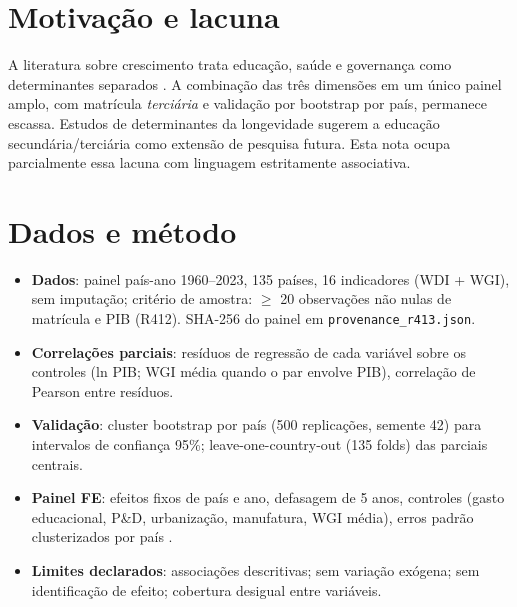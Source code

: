 \documentclass[12pt,a4paper]{article}
\begin{document}
\section{Motivação e lacuna}

A literatura sobre crescimento trata educação, saúde e governança como determinantes separados \cite{acemoglu2014,barro2013,kaufmann2011}. A combinação das três dimensões em um único painel amplo, com matrícula \emph{terciária} e validação por bootstrap por país, permanece escassa. Estudos de determinantes da longevidade sugerem a educação secundária/terciária como extensão de pesquisa futura. Esta nota ocupa parcialmente essa lacuna com linguagem estritamente associativa.

\section{Dados e método}

\begin{itemize}
\item \textbf{Dados}: painel país-ano 1960--2023, 135 países, 16 indicadores (WDI + WGI), sem imputação; critério de amostra: $\geq$ 20 observações não nulas de matrícula e PIB (R412). SHA-256 do painel em \texttt{provenance\_r413.json}.
\item \textbf{Correlações parciais}: resíduos de regressão de cada variável sobre os controles (ln PIB; WGI média quando o par envolve PIB), correlação de Pearson entre resíduos.
\item \textbf{Validação}: cluster bootstrap por país (500 replicações, semente 42) para intervalos de confiança 95\%; leave-one-country-out (135 folds) das parciais centrais.
\item \textbf{Painel FE}: efeitos fixos de país e ano, defasagem de 5 anos, controles (gasto educacional, P\&D, urbanização, manufatura, WGI média), erros padrão clusterizados por país \cite{cameron2015}.
\item \textbf{Limites declarados}: associações descritivas; sem variação exógena; sem identificação de efeito; cobertura desigual entre variáveis.
\end{itemize}
\end{document}
